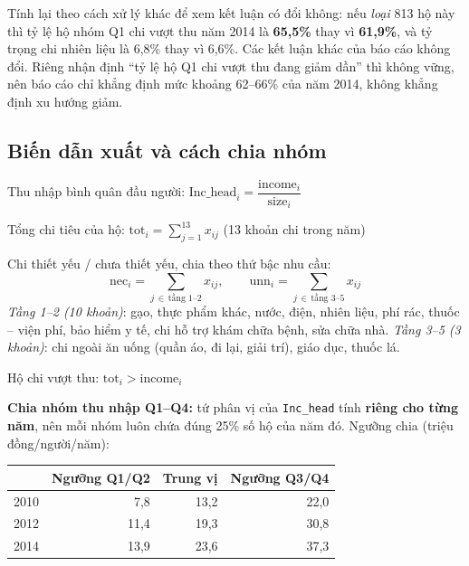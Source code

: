 \documentclass[11pt,a4paper]{article}
\newcommand{\n}[1]{\textbf{#1}}
\begin{document}
\begin{luuy}
Tính lại theo cách xử lý khác để xem kết luận có đổi không: nếu \emph{loại} 813 hộ này thì tỷ lệ hộ nhóm Q1 chi vượt thu năm 2014 là \n{65,5\%} thay vì \n{61,9\%}, và tỷ trọng chi nhiên liệu là 6,8\% thay vì 6,6\%. Các kết luận khác của báo cáo không đổi. Riêng nhận định “tỷ lệ hộ Q1 chi vượt thu đang giảm dần” thì không vững, nên báo cáo chỉ khẳng định mức khoảng 62–66\% của năm 2014, không khẳng định xu hướng giảm.
\end{luuy}

\subsection{Biến dẫn xuất và cách chia nhóm}

\begin{ct}
Thu nhập bình quân đầu người: \quad $\text{Inc\_head}_i = \dfrac{\text{income}_i}{\text{size}_i}$
\smallskip

Tổng chi tiêu của hộ: \quad $\text{tot}_i = \sum_{j=1}^{13} x_{ij}$ \quad (13 khoản chi trong năm)
\smallskip

Chi thiết yếu / chưa thiết yếu, chia theo thứ bậc nhu cầu:
\[\text{nec}_i = \!\!\sum_{j \,\in\, \text{tầng 1–2}}\!\! x_{ij}, \qquad \text{unn}_i = \!\!\sum_{j \,\in\, \text{tầng 3–5}}\!\! x_{ij}\]
\emph{Tầng 1–2 (10 khoản)}: gạo, thực phẩm khác, nước, điện, nhiên liệu, phí rác, thuốc – viện phí, bảo hiểm y tế, chi hỗ trợ khám chữa bệnh, sửa chữa nhà. \quad \emph{Tầng 3–5 (3 khoản)}: chi ngoài ăn uống (quần áo, đi lại, giải trí), giáo dục, thuốc lá.
\smallskip

Hộ chi vượt thu: \quad $\text{tot}_i > \text{income}_i$
\end{ct}

\n{Chia nhóm thu nhập Q1–Q4:} tứ phân vị của \texttt{Inc\_head} tính \n{riêng cho từng năm}, nên mỗi nhóm luôn chứa đúng 25\% số hộ của năm đó. Ngưỡng chia (triệu đồng/người/năm):

\begin{table}[H]\centering\small
\begin{tabular}{lrrr}
\toprule
& Ngưỡng Q1/Q2 & Trung vị & Ngưỡng Q3/Q4\\
\midrule
2010 & 7,8 & 13,2 & 22,0\\
2012 & 11,4 & 19,3 & 30,8\\
2014 & 13,9 & 23,6 & 37,3\\
\bottomrule
\end{tabular}
\end{table}
\end{document}
